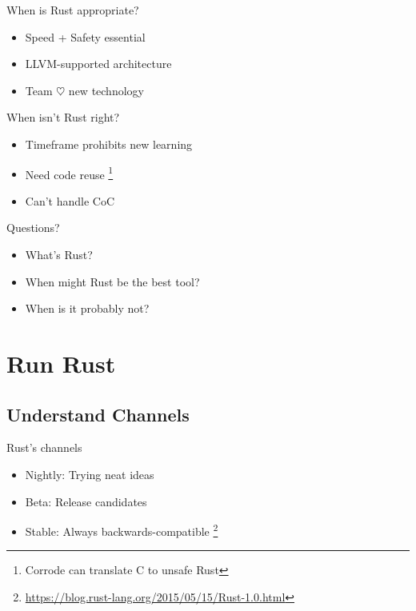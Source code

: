 \documentclass[50pt]{beamer}
\begin{document}
    \begin{frame}
        When is Rust appropriate?
        \begin{itemize}
            \item Speed + Safety essential
            \item LLVM-supported architecture
            \item Team $\heartsuit$ new technology
        \end{itemize}
    \end{frame}

    \begin{frame}
        When isn't Rust right?
        \begin{itemize}
            \item Timeframe prohibits new learning
            \item Need code reuse \footnote{Corrode can translate C to unsafe Rust}
            \item Can't handle CoC
        \end{itemize}
    \end{frame}

    \begin{frame}
        Questions?
        \begin{itemize}
            \item What's Rust?
            \item When might Rust be the best tool?
            \item When is it probably not?
        \end{itemize}
    \end{frame}

\section{Run Rust}

    \subsection{Understand Channels}

    \begin{frame}
        Rust's channels
        \begin{itemize}
            \item Nightly: Trying neat ideas
            \item Beta: Release candidates
            \item Stable: Always backwards-compatible \footnote{\url{https://blog.rust-lang.org/2015/05/15/Rust-1.0.html}}
        \end{itemize}
    \end{frame}
\end{document}
